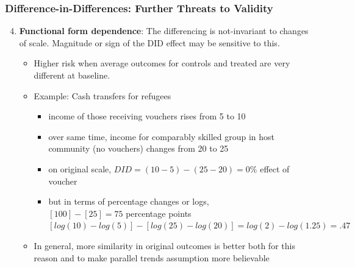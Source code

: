 \documentclass[xcolor=dvipsnames]{beamer}
\begin{document}
\begin{frame}
  \frametitle{Difference-in-Differences: Further Threats to Validity}
\begin{enumerate}
\setcounter{enumi}{3}
 \item<1-> \textbf{Functional form dependence}:  The differencing is not-invariant to changes of scale. Magnitude or sign of the DID effect may be sensitive to this.
 \begin{itemize}
   \item<2-> Higher risk when average outcomes for controls and treated are very different at baseline.
   \medskip
   
 \item<3-> Example: Cash transfers for refugees
 \begin{itemize}
   \item<4-> income of those receiving vouchers rises from 5 to 10
   \item<5-> over same time, income for comparably skilled group in host community (no vouchers) changes from 20 to 25
   \item<6-> on original scale, $DID = (10 - 5) - (25 - 20) = 0\%$ effect of voucher \medskip \pause
   \item<7-> but in terms of percentage changes or logs, \\
   $[100]-[25]= 75$ percentage points \\
   $[log(10) - log(5)] - [log(25) - log(20)] = log(2)- log(1.25)  = .47$
 \end{itemize}\bigskip
 \item<8-> In general, more similarity in original outcomes is better both for this reason and to make parallel trends assumption more believable
 \end{itemize}
\end{enumerate}
\end{frame}
\end{document}
